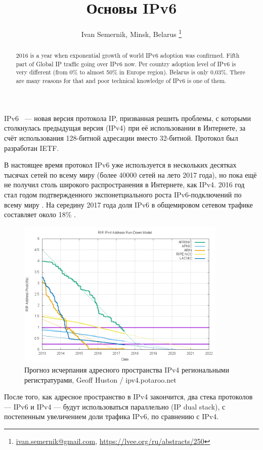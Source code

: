 \documentclass[10pt, a5paper]{article}
\begin{document}
\title{Основы IPv6}
\author{Ivan Semernik, Minsk, Belarus \footnote{\url{ivan.semernik@gmail.com}, \url {https://lvee.org/ru/abstracts/250}}}
\maketitle
\begin{abstract}
2016 is a year when exponential growth of world IPv6 adoption was confirmed. Fifth part of Global IP traffic going over IPv6 now. Per country adoption level of IPv6 is very different (from 0\% to almost 50\% in Europe region). Belarus is only 0,03\%. There are many reasons for that and poor technical knowledge of IPv6 is one of them.
\end{abstract}
IPv6 ~--- новая версия протокола IP, призванная решить проблемы, с которыми столкнулась предыдущая версия (IPv4) при её использовании в Интернете, за счёт использования 128-битной адресации вместо 32-битной. Протокол был разработан IETF\cite{Semernik-0}.

В настоящее время протокол IPv6 уже используется в нескольких десятках тысячах сетей по всему миру (более 40000 сетей на лето 2017 года), но пока ещё не получил столь широкого распространения в Интернете, как IPv4. 2016 год стал годом подтвержденного экспонетциального роста IPv6-подключений по всему миру \cite{Semernik-1}. На середину 2017 года доля IPv6 в общемировом сетевом трафике составляет около 18\% \cite{Semernik-2}.

\begin{figure}[h!]
  \centering
  \includegraphics[width=10cm]{Semernik1}
  \caption{Прогноз исчерпания адресного пространства IPv4 региональными регистратурами, Geoff Huston / ipv4.potaroo.net}
\end{figure}


После того, как адресное пространство в IPv4 закончится, два стека протоколов — IPv6 и IPv4 — будут использоваться параллельно (IP dual stack), с постепенным увеличением доли трафика IPv6, по сравнению с IPv4.
\end{document}
